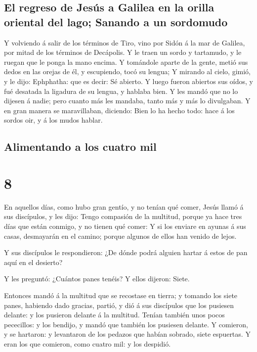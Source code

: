 \hypertarget{el-regreso-de-jesuxfas-a-galilea-en-la-orilla-oriental-del-lago-sanando-a-un-sordomudo}{%
\subsection{El regreso de Jesús a Galilea en la orilla oriental del
lago; Sanando a un
sordomudo}\label{el-regreso-de-jesuxfas-a-galilea-en-la-orilla-oriental-del-lago-sanando-a-un-sordomudo}}

 Y volviendo á salir de los términos de Tiro, vino por
Sidón á la mar de Galilea, por mitad de los términos de Decápolis.
 Y le traen un sordo y tartamudo, y le ruegan que le
ponga la mano encima.  Y tomándole aparte de la gente,
metió sus dedos en las orejas de él, y escupiendo, tocó su lengua;
 Y mirando al cielo, gimió, y le dijo: Ephphatha: que es
decir: Sé abierto.  Y luego fueron abiertos sus oídos, y
fué desatada la ligadura de su lengua, y hablaba bien.  Y
les mandó que no lo dijesen á nadie; pero cuanto más les mandaba, tanto
más y más lo divulgaban.  Y en gran manera se
maravillaban, diciendo: Bien lo ha hecho todo: hace á los sordos oir, y
á los mudos hablar.

\hypertarget{alimentando-a-los-cuatro-mil}{%
\subsection{Alimentando a los cuatro
mil}\label{alimentando-a-los-cuatro-mil}}

\hypertarget{section-41-8}{%
\section{8}\label{section-41-8}}

 En aquellos días, como hubo gran gentío, y no tenían qué
comer, Jesús llamó á sus discípulos, y les dijo:  Tengo
compasión de la multitud, porque ya hace tres días que están conmigo, y
no tienen qué comer:  Y si los enviare en ayunas á sus
casas, desmayarán en el camino; porque algunos de ellos han venido de
lejos.

 Y sus discípulos le respondieron: ¿De dónde podrá alguien
hartar á estos de pan aquí en el desierto?

 Y les preguntó: ¿Cuántos panes tenéis? Y ellos dijeron:
Siete.

 Entonces mandó á la multitud que se recostase en tierra;
y tomando los siete panes, habiendo dado gracias, partió, y dió á sus
discípulos que los pusiesen delante: y los pusieron delante á la
multitud.  Tenían también unos pocos pececillos: y los
bendijo, y mandó que también los pusiesen delante.  Y
comieron, y se hartaron: y levantaron de los pedazos que habían sobrado,
siete espuertas.  Y eran los que comieron, como cuatro
mil: y los despidió.


